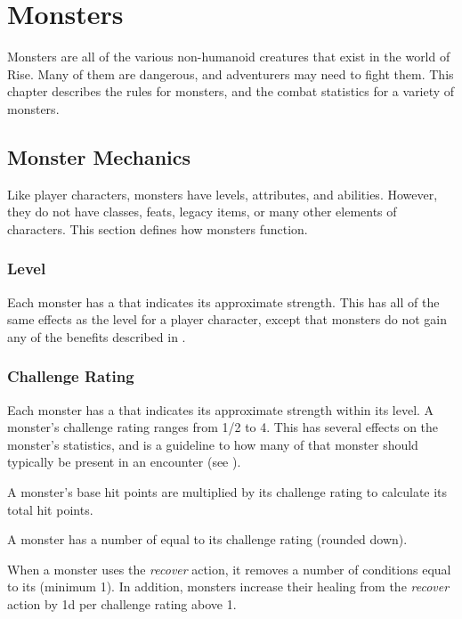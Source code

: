 \chapter{Monsters}

Monsters are all of the various non-humanoid creatures that exist in the world of Rise.
Many of them are dangerous, and adventurers may need to fight them.
This chapter describes the rules for monsters, and the combat statistics for a variety of monsters.

\section{Monster Mechanics}
    Like player characters, monsters have levels, attributes, and abilities.
    However, they do not have classes, feats, legacy items, or many other elements of characters.
    This section defines how monsters function.

    \subsection{Level}
        Each monster has a  that indicates its approximate strength.
        This has all of the same effects as the level for a player character, except that monsters do not gain any of the benefits described in .

    \subsection{Challenge Rating}
        Each monster has a  that indicates its approximate strength within its level.
        A monster's challenge rating ranges from 1/2 to 4.
        This has several effects on the monster's statistics, and is a guideline to how many of that monster should typically be present in an encounter (see ).

         A monster's base hit points are multiplied by its challenge rating to calculate its total hit points.

         A monster has a number of  equal to its challenge rating  (rounded down).

         When a monster uses the \textit{recover} action, it removes a number of conditions equal to its  (minimum 1).
        In addition, monsters increase their healing from the \textit{recover} action by \plus1d per challenge rating above 1.

